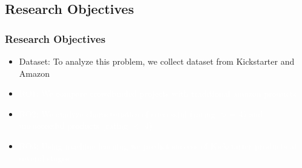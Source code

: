 \documentclass[9pt]{beamer}
\begin{document}
\begin{comment}
\begin{frame}
\frametitle{Ex 4: Examples of Unsuccessful Products on Amazon }
\begin{columns}
	\begin{column}{.40\textwidth} {\textbf{Beam Smart Projector}}
		
		\begin{itemize}[label=\textcolor{blue}{\textbullet}]
			\item{\small Amazon rating 2.9}
			\item{\small Raised 4 times}
		\end{itemize}
	\end{column}		
	
	\begin{column}{.50\textwidth} 
		\texttt{[image: ./image\_2/beam.png]}
	\end{column}				
\end{columns}
\end{frame}
\end{comment}






\subsection{Research Objectives}	


\begin{frame}
	\frametitle{Research Objectives}
	\begin{itemize}[label=\textcolor{blue}{\textbullet}]
		\item{Dataset: To analyze this problem, we collect dataset from Kickstarter and Amazon}
		\item[\textcolor{white}{\textbullet}]{\textcolor{white}{RO1: We compare crowdfunded projects with traditional amazon products}}
		\item[\textcolor{white}{\textbullet}]{\textcolor{white}{RO2: We analyze characteristics of successful (rating $>$= 4) and unsuccessful products (rating $<$ 4)}}
		\item[\textcolor{white}{\textbullet}]{\textcolor{white}{RO3: Using machine learning we predict success of Kickstarter products at several stages}}
	\end{itemize}
\end{frame}
\end{document}
